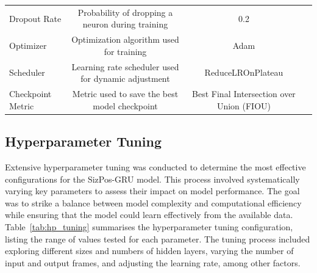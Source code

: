 \documentclass[12pt,oneside]{book} %
\begin{document}
\begin{table}[H]
\begin{adjustbox}{max width=\textwidth}
\begin{tabular}{lccc}
            Dropout Rate       & Probability of dropping a neuron during training           & 0.2                                       \\ 
            Optimizer          & Optimization algorithm used for training                   & Adam                                      \\ 
            Scheduler          & Learning rate scheduler used for dynamic adjustment        & ReduceLROnPlateau                         \\ 
            Checkpoint Metric  & Metric used to save the best model checkpoint              & Best Final Intersection over Union (FIOU) \\ 
            \bottomrule
        \end{tabular}
    \end{adjustbox}
\end{table}

\subsection*{Hyperparameter Tuning}
\noindent Extensive hyperparameter tuning was conducted to determine the most effective
configurations for the SizPos-GRU model. This process involved systematically
varying key parameters to assess their impact on model performance. The goal
was to strike a balance between model complexity and computational efficiency
while ensuring that the model could learn effectively from the available data.
Table~\ref{tab:hp_tuning} summarises the hyperparameter tuning configuration,
listing the range of values tested for each parameter. The tuning process
included exploring different sizes and numbers of hidden layers, varying the
number of input and output frames, and adjusting the learning rate, among other
factors.
\end{document}
